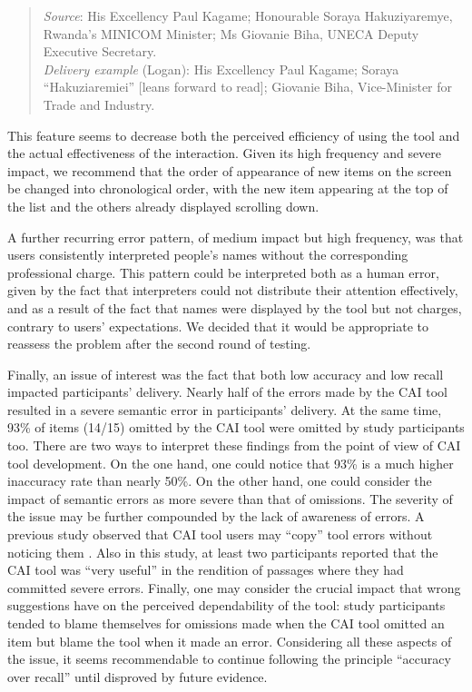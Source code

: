 \begin{quote}
\begin{sloppypar}
    \textit{Source}: His Excellency Paul Kagame; Honourable Soraya Hakuziyaremye, Rwanda's MINICOM Minister; Ms Giovanie Biha, UNECA Deputy Executive Secretary.\\
    \textit{Delivery example} (Logan): His Excellency Paul Kagame; Soraya ``Hakuziaremiei'' [leans forward to read]; Giovanie Biha, Vice-Minister for Trade and Industry.
\end{sloppypar}
\end{quote}
This feature seems to decrease both the perceived efficiency of using the tool and the actual effectiveness of the interaction. Given its high frequency and severe impact, we recommend that the order of appearance of new items on the screen be changed into chronological order, with the new item appearing at the top of the list and the others already displayed scrolling down.

A further recurring error pattern, of medium impact but high frequency, was that users consistently interpreted people’s names without the corresponding professional charge. This pattern could be interpreted both as a human error, given by the fact that interpreters could not distribute their attention effectively, and as a result of the fact that names were displayed by the tool but not charges, contrary to users’ expectations. We decided that it would be appropriate to reassess the problem after the second round of testing.

Finally, an issue of interest was the fact that both low accuracy and low recall impacted participants’ delivery. Nearly half of the errors made by the CAI tool resulted in a severe semantic error in participants’ delivery. At the same time, 93\% of items (14/15) omitted by the CAI tool were omitted by study participants too. There are two ways to interpret these findings from the point of view of CAI tool development. On the one hand, one could notice that 93\% is a much higher inaccuracy rate than nearly 50\%. On the other hand, one could consider the impact of semantic errors as more severe than that of omissions. The severity of the issue may be further compounded by the lack of awareness of errors. A previous study observed that CAI tool users may ``copy'' tool errors without noticing them \citep{defrancq2021automatic}. Also in this study, at least two participants reported that the CAI tool was ``very useful'' in the rendition of passages where they had committed severe errors. Finally, one may consider the crucial impact that wrong suggestions have on the perceived dependability of the tool: study participants tended to blame themselves for omissions made when the CAI tool omitted an item but blame the tool when it made an error. Considering all these aspects of the issue, it seems recommendable to continue following the principle ``accuracy over recall'' until disproved by future evidence.



